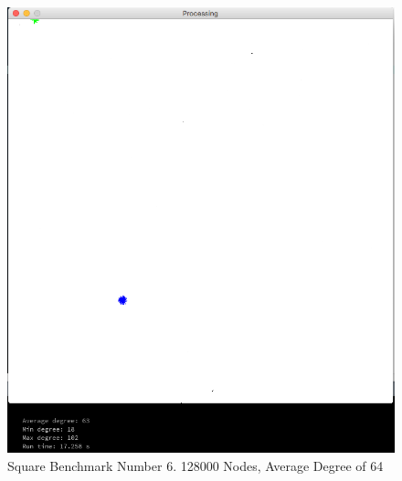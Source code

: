 \documentclass{article}
\begin{document}
\begin{figure}
    \centering
    \includegraphics[scale=0.45]{./images/square_5.png}
    \caption{Square Benchmark Number 6. 128000 Nodes, Average Degree of 64}
    \label{square5}
\end{figure}
\end{document}
